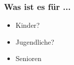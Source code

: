 \documentclass[12pt]{beamer}
\begin{document}
\begin{frame}
	\frametitle{Was ist es für ...}
	\begin{itemize}
		\item<1-> Kinder?
		\begin{center}
		\end{center}
		\item<3-> Jugendliche?
		\begin{center}
		\end{center}
		\item<5-> Senioren
		\begin{center}
\end{center}
\end{itemize}
\end{frame}
\end{document}
